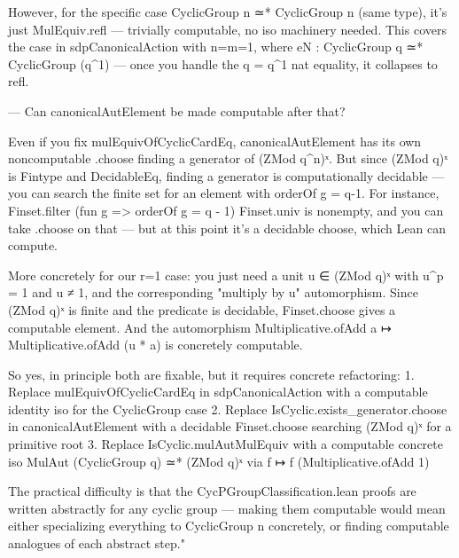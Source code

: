   However, for the specific case CyclicGroup n ≃* CyclicGroup n (same type), it's just MulEquiv.refl — trivially computable, no iso machinery needed. This covers the case in sdpCanonicalAction with n=m=1,
  where eN : CyclicGroup q ≃* CyclicGroup (q^1) — once you handle the q = q^1 nat equality, it collapses to refl.

  ---
  Can canonicalAutElement be made computable after that?
  
  Even if you fix mulEquivOfCyclicCardEq, canonicalAutElement has its own noncomputable .choose finding a generator of (ZMod q^n)ˣ. But since (ZMod q)ˣ is Fintype and DecidableEq, finding a generator is 
  computationally decidable — you can search the finite set for an element with orderOf g = q-1. For instance, Finset.filter (fun g => orderOf g = q - 1) Finset.univ is nonempty, and you can take .choose on
  that — but at this point it's a decidable choose, which Lean can compute.

  More concretely for our r=1 case: you just need a unit u ∈ (ZMod q)ˣ with u^p = 1 and u ≠ 1, and the corresponding "multiply by u" automorphism. Since (ZMod q)ˣ is finite and the predicate is decidable,
  Finset.choose gives a computable element. And the automorphism Multiplicative.ofAdd a ↦ Multiplicative.ofAdd (u * a) is concretely computable.

  So yes, in principle both are fixable, but it requires concrete refactoring:
  1. Replace mulEquivOfCyclicCardEq in sdpCanonicalAction with a computable identity iso for the CyclicGroup case
  2. Replace IsCyclic.exists_generator.choose in canonicalAutElement with a decidable Finset.choose searching (ZMod q)ˣ for a primitive root
  3. Replace IsCyclic.mulAutMulEquiv with a computable concrete iso MulAut (CyclicGroup q) ≃* (ZMod q)ˣ via f ↦ f (Multiplicative.ofAdd 1)
  
  The practical difficulty is that the CycPGroupClassification.lean proofs are written abstractly for any cyclic group — making them computable would mean either specializing everything to CyclicGroup n
  concretely, or finding computable analogues of each abstract step."

